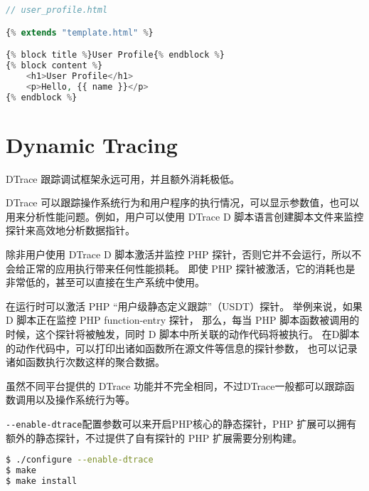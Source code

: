 \begin{lstlisting}[language=PHP]
// user_profile.html

{% extends "template.html" %}

{% block title %}User Profile{% endblock %}
{% block content %}
    <h1>User Profile</h1>
    <p>Hello, {{ name }}</p>
{% endblock %}
\end{lstlisting}


\section{Dynamic Tracing}

DTrace 跟踪调试框架永远可用，并且额外消耗极低。

DTrace 可以跟踪操作系统行为和用户程序的执行情况，可以显示参数值，也可以用来分析性能问题。例如，用户可以使用 DTrace D 脚本语言创建脚本文件来监控探针来高效地分析数据指针。


除非用户使用 DTrace D 脚本激活并监控 PHP 探针，否则它并不会运行，所以不会给正常的应用执行带来任何性能损耗。 即使 PHP 探针被激活，它的消耗也是非常低的，甚至可以直接在生产系统中使用。



在运行时可以激活 PHP “用户级静态定义跟踪”（USDT）探针。 举例来说，如果 D 脚本正在监控 PHP function-entry 探针， 那么，每当 PHP 脚本函数被调用的时候，这个探针将被触发，同时 D 脚本中所关联的动作代码将被执行。 在D脚本的动作代码中，可以打印出诸如函数所在源文件等信息的探针参数， 也可以记录诸如函数执行次数这样的聚合数据。


虽然不同平台提供的 DTrace 功能并不完全相同，不过DTrace一般都可以跟踪函数调用以及操作系统行为等。

\texttt{-\/-enable-dtrace}配置参数可以来开启PHP核心的静态探针，PHP 扩展可以拥有额外的静态探针，不过提供了自有探针的 PHP 扩展需要分别构建。

\begin{lstlisting}[language=bash]
$ ./configure --enable-dtrace
$ make
$ make install
\end{lstlisting}


